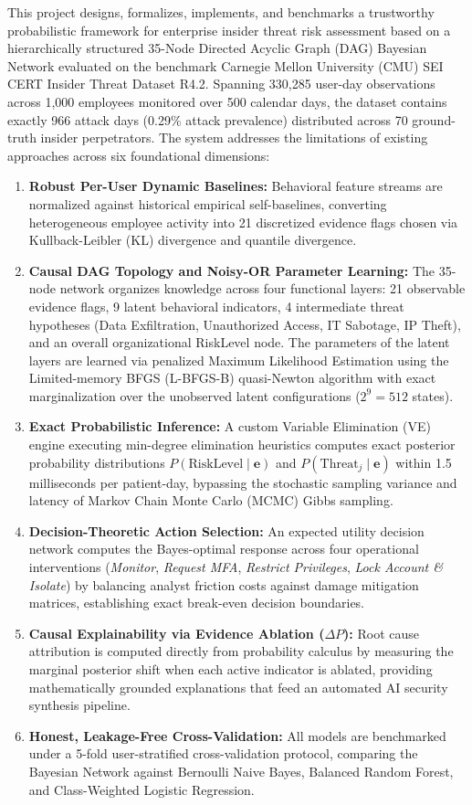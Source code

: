 \documentclass[12pt,a4paper]{report}
\begin{document}
This project designs, formalizes, implements, and benchmarks a trustworthy probabilistic framework for enterprise insider threat risk assessment based on a hierarchically structured 35-Node Directed Acyclic Graph (DAG) Bayesian Network evaluated on the benchmark Carnegie Mellon University (CMU) SEI CERT Insider Threat Dataset R4.2. Spanning 330,285 user-day observations across 1,000 employees monitored over 500 calendar days, the dataset contains exactly 966 attack days (0.29\% attack prevalence) distributed across 70 ground-truth insider perpetrators. The system addresses the limitations of existing approaches across six foundational dimensions:
\begin{enumerate}
    \item \textbf{Robust Per-User Dynamic Baselines:} Behavioral feature streams are normalized against historical empirical self-baselines, converting heterogeneous employee activity into 21 discretized evidence flags chosen via Kullback-Leibler (KL) divergence and quantile divergence.
    \item \textbf{Causal DAG Topology and Noisy-OR Parameter Learning:} The 35-node network organizes knowledge across four functional layers: 21 observable evidence flags, 9 latent behavioral indicators, 4 intermediate threat hypotheses (Data Exfiltration, Unauthorized Access, IT Sabotage, IP Theft), and an overall organizational RiskLevel node. The parameters of the latent layers are learned via penalized Maximum Likelihood Estimation using the Limited-memory BFGS (L-BFGS-B) quasi-Newton algorithm with exact marginalization over the unobserved latent configurations ($2^9 = 512$ states).
    \item \textbf{Exact Probabilistic Inference:} A custom Variable Elimination (VE) engine executing min-degree elimination heuristics computes exact posterior probability distributions $P(\text{RiskLevel} \mid \mathbf{e})$ and $P(\text{Threat}_j \mid \mathbf{e})$ within 1.5 milliseconds per patient-day, bypassing the stochastic sampling variance and latency of Markov Chain Monte Carlo (MCMC) Gibbs sampling.
    \item \textbf{Decision-Theoretic Action Selection:} An expected utility decision network computes the Bayes-optimal response across four operational interventions (\textit{Monitor}, \textit{Request MFA}, \textit{Restrict Privileges}, \textit{Lock Account \& Isolate}) by balancing analyst friction costs against damage mitigation matrices, establishing exact break-even decision boundaries.
    \item \textbf{Causal Explainability via Evidence Ablation ($\Delta P$):} Root cause attribution is computed directly from probability calculus by measuring the marginal posterior shift when each active indicator is ablated, providing mathematically grounded explanations that feed an automated AI security synthesis pipeline.
    \item \textbf{Honest, Leakage-Free Cross-Validation:} All models are benchmarked under a 5-fold user-stratified cross-validation protocol, comparing the Bayesian Network against Bernoulli Naive Bayes, Balanced Random Forest, and Class-Weighted Logistic Regression.
\end{enumerate}
\end{document}
